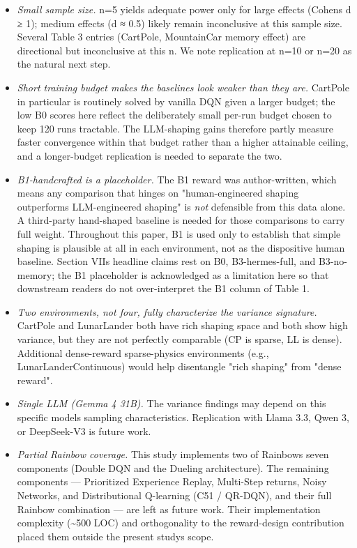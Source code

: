 \documentclass[conference,letterpaper,10pt]{IEEEtran}
\providecommand{\tightlist}{\setlength{\itemsep}{0pt}\setlength{\parskip}{0pt}}
\begin{document}
\begin{itemize}
\tightlist
\item
  \emph{Small sample size.} n=5 yields adequate power only for large effects (Cohen\textquotesingle s d ≥ 1); medium effects (d ≈ 0.5) likely remain inconclusive at this sample size. Several Table 3 entries (CartPole, MountainCar memory effect) are directional but inconclusive at this n. We note replication at n=10 or n=20 as the natural next step.
\item
  \emph{Short training budget makes the baselines look weaker than they are.} CartPole in particular is routinely solved by vanilla DQN given a larger budget; the low B0 scores here reflect the deliberately small per-run budget chosen to keep 120 runs tractable. The LLM-shaping gains therefore partly measure faster convergence within that budget rather than a higher attainable ceiling, and a longer-budget replication is needed to separate the two.
\item
  \emph{B1-handcrafted is a placeholder.} The B1 reward was author-written, which means any comparison that hinges on "human-engineered shaping outperforms LLM-engineered shaping" is \emph{not} defensible from this data alone. A third-party hand-shaped baseline is needed for those comparisons to carry full weight. Throughout this paper, B1 is used only to establish that simple shaping is plausible at all in each environment, not as the dispositive human baseline. Section VII\textquotesingle s headline claims rest on B0, B3-hermes-full, and B3-no-memory; the B1 placeholder is acknowledged as a limitation here so that downstream readers do not over-interpret the B1 column of Table 1.
\item
  \emph{Two environments, not four, fully characterize the variance signature.} CartPole and LunarLander both have rich shaping space and both show high variance, but they are not perfectly comparable (CP is sparse, LL is dense). Additional dense-reward sparse-physics environments (e.g., LunarLanderContinuous) would help disentangle "rich shaping" from "dense reward".
\item
  \emph{Single LLM (Gemma 4 31B).} The variance findings may depend on this specific model\textquotesingle s sampling characteristics. Replication with Llama 3.3, Qwen 3, or DeepSeek-V3 is future work.
\item
  \emph{Partial Rainbow coverage.} This study implements two of Rainbow\textquotesingle s seven components (Double DQN and the Dueling architecture). The remaining components --- Prioritized Experience Replay, Multi-Step returns, Noisy Networks, and Distributional Q-learning (C51 / QR-DQN), and their full Rainbow combination --- are left as future work. Their implementation complexity (\textasciitilde500 LOC) and orthogonality to the reward-design contribution placed them outside the present study\textquotesingle s scope.

\end{itemize}
\end{document}
